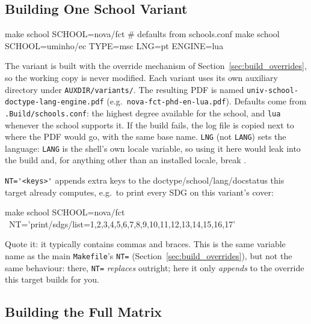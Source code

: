 \subsection{Building One School Variant}
\label{sec:build_school}

\begin{bashcode}
make school SCHOOL=nova/fct                     # defaults from schools.conf
make school SCHOOL=uminho/ec TYPE=msc LNG=pt ENGINE=lua
\end{bashcode}

The variant is built with the override mechanism of
Section~\ref{sec:build_overrides}, so the working copy is never modified.
Each variant uses its own auxiliary directory under \verb!AUXDIR/variants/!.
The resulting \gls{PDF} is named
\texttt{univ-school-doctype-lang-engine.pdf} (e.g.\
\verb!nova-fct-phd-en-lua.pdf!).  Defaults come from
\verb!.Build/schools.conf!: the highest degree available for the school, and
\texttt{lua} whenever the school supports it.  If the build fails, the log
file is copied next to where the \gls{PDF} would go, with the same base name.
\texttt{LNG} (not \texttt{LANG}) sets the language: \texttt{LANG} is the
shell's own locale variable, so using it here would leak into the build
and, for anything other than an installed locale, break .

\verb!NT='<keys>'! appends extra \latexinline{\ntsetup} keys to the
doctype/school/lang/docstatus this target already computes, e.g.\ to print
every SDG on this variant's cover:
\begin{bashcode}
make school SCHOOL=nova/fct \
    NT='print/sdgs/list={1,2,3,4,5,6,7,8,9,10,11,12,13,14,15,16,17}'
\end{bashcode}
Quote it: it typically contains commas and braces.  This is the same
variable name as the main \verb!Makefile!'s \verb!NT=!
(Section~\ref{sec:build_overrides}), but not the same behaviour: there,
\verb!NT=! \emph{replaces} \latexinline{\ntoverride} outright; here it only
\emph{appends} to the override this target builds for you.

\subsection{Building the Full Matrix}
\label{sec:build_matrix}

